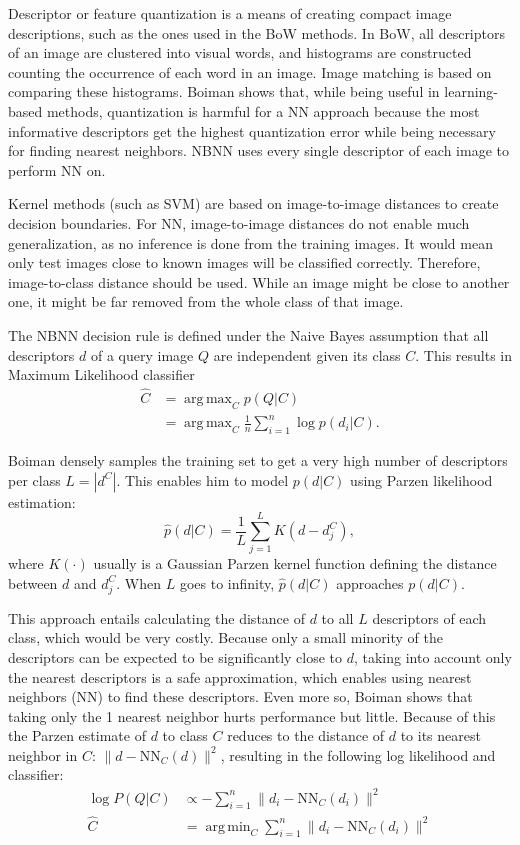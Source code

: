 \documentclass[a4paper,10pt]{article}
\DeclareMathOperator*{\argmax}{arg\,max}
\DeclareMathOperator*{\argmin}{arg\,min}
\begin{document}
Descriptor or feature quantization is a means of creating compact image descriptions, such as the ones used in the BoW methods. In BoW, all descriptors of an image are clustered into visual words, and histograms are constructed counting the occurrence of each word in an image. Image matching is based on comparing these histograms. Boiman shows that, while being useful in learning-based methods, quantization is harmful for a NN approach because the most informative descriptors get the highest quantization error while being necessary for finding nearest neighbors. NBNN uses every single descriptor of each image to perform NN on.

Kernel methods (such as SVM) are based on image-to-image distances to create decision boundaries. For NN, image-to-image distances do not enable much generalization, as no inference is done from the training images. It would mean only test images close to known images will be classified correctly. Therefore, image-to-class distance should be used. While an image might be close to another one, it might be far removed from the whole class of that image. \cite{wang2009learning}

The NBNN decision rule is defined under the Naive Bayes assumption that all descriptors $d$ of a query image $Q$ are independent given its class $C$. This results in Maximum Likelihood classifier 
\begin{align}
    \hat C &= \argmax_C p(Q|C)\\
           &= \argmax_C \frac{1}{n}\sum_{i=1}^{n} \log p(d_i|C).
\end{align}

Boiman densely samples the training set to get a very high number of descriptors per class $L = |d^C|$. This enables him to model $p(d|C)$ using Parzen likelihood estimation:
\begin{equation}
    \hat p(d|C) = \frac{1}{L}\sum_{j=1}^L K(d-d_j^C),
\end{equation}
where $K(\cdot)$ usually is a Gaussian Parzen kernel function defining the distance between $d$ and $d_j^C$. When $L$ goes to infinity, $\hat p(d|C)$ approaches $p(d|C)$.

This approach entails calculating the distance of $d$ to all $L$ descriptors of each class, which would be very costly. Because only a small minority of the descriptors can be expected to be significantly close to $d$, taking into account only the nearest descriptors is a safe approximation, which enables using nearest neighbors (NN) to find these descriptors. Even more so, Boiman shows that taking only the 1 nearest neighbor hurts performance but little. Because of this the Parzen estimate of $d$ to class $C$ reduces to the distance of $d$ to its nearest neighbor in $C$: $\|d - \text{NN}_C(d)\|^2$, resulting in the following log likelihood and classifier: 
\begin{align}
    \log P(Q|C) &\propto -\sum_{i=1}^n \|d_i - \text{NN}_C(d_i)\|^2 \\
    \hat C      &= \argmin_C \sum_{i=1}^n \|d_i - \text{NN}_C(d_i)\|^2
\end{align}
\end{document}
